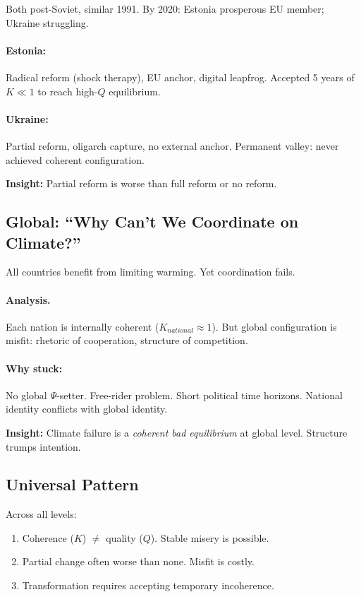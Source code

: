 \documentclass[12pt,a4paper]{article}
\begin{document}
Both post-Soviet, similar 1991. By 2020: Estonia prosperous EU member; Ukraine struggling.

\paragraph{Estonia:} Radical reform (shock therapy), EU anchor, digital leapfrog.
Accepted 5 years of $K \ll 1$ to reach high-$Q$ equilibrium.

\paragraph{Ukraine:} Partial reform, oligarch capture, no external anchor.
Permanent valley: never achieved coherent configuration.

\textbf{Insight:} Partial reform is worse than full reform or no reform.

\subsection{Global: ``Why Can't We Coordinate on Climate?''}

All countries benefit from limiting warming. Yet coordination fails.

\paragraph{Analysis.}
Each nation is internally coherent ($K_{national} \approx 1$).
But global configuration is misfit: rhetoric of cooperation, structure of competition.

\paragraph{Why stuck:}
No global $\Psi$-setter. Free-rider problem. Short political time horizons.
National identity conflicts with global identity.

\textbf{Insight:} Climate failure is a \emph{coherent bad equilibrium} at global level.
Structure trumps intention.

\subsection{Universal Pattern}

Across all levels:
\begin{enumerate}
  \item Coherence ($K$) $\neq$ quality ($Q$). Stable misery is possible.
  \item Partial change often worse than none. Misfit is costly.
  \item Transformation requires accepting temporary incoherence.
\end{enumerate}
\end{document}
